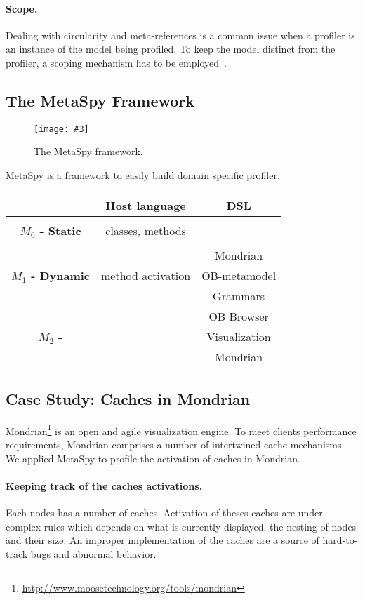 \documentclass[runningheads]{llncs}
\newcommand{\project}{{\sc MetaSpy}\xspace}
\newcommand{\fig}[4]{
	\begin{figure}[#1]
		\centering
		\texttt{[image: \#3]}
		\caption{\label{fig:#3}#4}
	\end{figure}}
\begin{document}
\paragraph{Scope.} 
Dealing with circularity and meta-references is a common issue when a profiler is an instance of the model being profiled. To keep the model distinct from the profiler, a scoping mechanism has to be employed~\cite{Tant10a}.


\subsection{The \project Framework}

\fig{}{.8}{MetaSpy}{The \project framework.}


\project is a framework to easily build domain specific profiler. 

\begin{tabular}{c|c|c}
					&	\textbf{Host language} 	& \textbf{DSL} \\ \hline
					&						& 		\\
\textbf{$M_0$ - Static}	&	classes, methods		& 		\\
					&						& 		\\\hline
					&						& Mondrian\\
\textbf{$M_1$ - Dynamic}	&	method activation		& OB-metamodel\\
					&						& Grammars\\ \hline
					&						& OB Browser\\
\textbf{$M_2$ -} 		&						& Visualization\\
					&						& Mondrian
\end{tabular}


\subsection{Case Study: Caches in Mondrian}

Mondrian\footnote{\url{http://www.moosetechnology.org/tools/mondrian}} is an open and agile visualization engine.
To meet clients performance requirements, Mondrian comprises a number of intertwined cache mechanisms. We applied \project to profile the activation of caches in Mondrian.

\paragraph{Keeping track of the caches activations.}
Each nodes has a number of caches. Activation of theses caches are under complex rules which depends on what is currently displayed, the nesting of nodes and their size. An improper implementation of the caches are a source of hard-to-track bugs and abnormal behavior.
\end{document}
